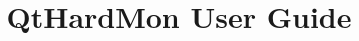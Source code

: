 \documentclass[12pt, a4paper]{report}
\begin{document}
\title{QtHardMon User Guide}
\maketitle
\tableofcontents

\end{document}
